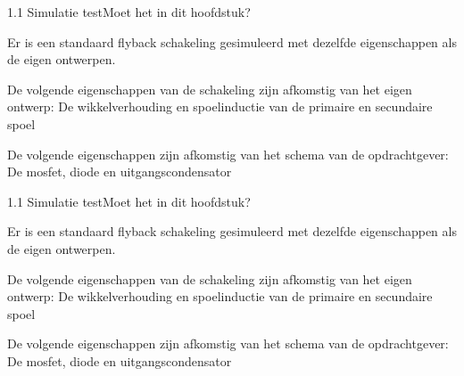 \documentclass[11pt,a4paper]{article}
\begin{document}
1.1 Simulatie testMoet het in dit hoofdstuk?

Er is een standaard flyback schakeling gesimuleerd met dezelfde eigenschappen als de eigen ontwerpen.

De volgende eigenschappen van de schakeling zijn afkomstig van het eigen ontwerp: De wikkelverhouding en spoelinductie van de primaire en secundaire spoel

De volgende eigenschappen zijn afkomstig van het schema van de opdrachtgever: De mosfet, diode en uitgangscondensator

1.1 Simulatie testMoet het in dit hoofdstuk?

Er is een standaard flyback schakeling gesimuleerd met dezelfde eigenschappen als de eigen ontwerpen.

De volgende eigenschappen van de schakeling zijn afkomstig van het eigen ontwerp: De wikkelverhouding en spoelinductie van de primaire en secundaire spoel

De volgende eigenschappen zijn afkomstig van het schema van de opdrachtgever: De mosfet, diode en uitgangscondensator
\end{document}
